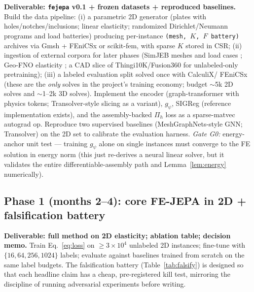 \documentclass[11pt]{article}
\begin{document}
\textbf{Deliverable: \texttt{fejepa} v0.1 + frozen datasets + reproduced baselines.}
Build the data pipeline: (i) a parametric 2D generator (plates with
holes/notches/inclusions; linear elasticity; randomized Dirichlet/Neumann
programs and load batteries) producing per-instance \texttt{(mesh, $K$, $F$
battery)} archives via Gmsh + FEniCSx or scikit-fem, with sparse $K$ stored
in CSR; (ii) ingestion of external corpora for later phases (SimJEB meshes
and load cases \cite{whalen2021simjeb}; Geo-FNO elasticity
\cite{li2023geofno}; a CAD slice of Thingi10K/Fusion360 for unlabeled-only
pretraining); (iii) a labeled evaluation split solved once with CalculiX/
FEniCSx (these are the \emph{only} solves in the project's training economy;
budget $\sim$5k 2D solves and $\sim$1--2k 3D solves). Implement the encoder
(graph-transformer with physics tokens; Transolver-style slicing as a
variant), $g_\psi$, SIGReg (reference implementation exists), and the
assembly-backed $\Pi_h$ loss as a sparse-matvec autograd op. Reproduce two
supervised baselines (MeshGraphNets-style GNN; Transolver) on the 2D set to
calibrate the evaluation harness. \emph{Gate G0:} energy-anchor unit test ---
training $g_\psi$ alone on single instances must converge to the FE solution
in energy norm (this just re-derives a neural linear solver, but it validates
the entire differentiable-assembly path and Lemma~\ref{lem:energy}
numerically).

\subsection{Phase 1 (months 2--4): core FE-JEPA in 2D + falsification battery}

\textbf{Deliverable: full method on 2D elasticity; ablation table; decision memo.}
Train Eq.~\eqref{eq:loss} on $\ge 3\times 10^4$ unlabeled 2D instances;
fine-tune with $\{16, 64, 256, 1024\}$ labels; evaluate against baselines
trained from scratch on the same label budgets. The falsification battery
(Table~\ref{tab:falsify}) is designed so that each headline claim has a
cheap, pre-registered kill test, mirroring the discipline of running
adversarial experiments before writing.
\end{document}
